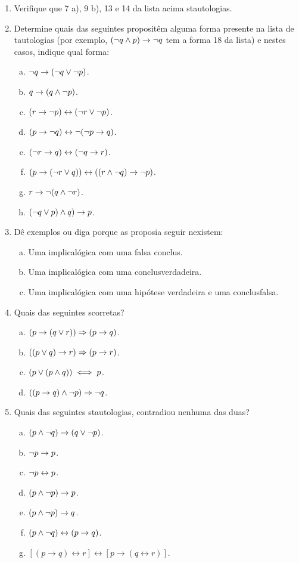 \begin{enumerate}[{\bf 1.}]
\item Verifique que 7 a), 9 b), 13 e 14 da lista acima s\ao tautologias.

\item Determine quais das seguintes proposi\coes t\^em alguma forma presente na lista de tautologias (por exemplo, $(\lnot q\wedge p)\to\lnot q$ tem a forma 18 da lista) e nestes casos, indique qual forma:
\begin{enumerate}[a)]
\item $\lnot q\to(\lnot q \vee\lnot p)$.
\item $q\to (q\wedge\lnot p)$.
\item $(r\to\lnot p)\leftrightarrow(\lnot r\vee\lnot p)$.
\item $(p\to\lnot q)\leftrightarrow\lnot(\lnot p\to q)$.
\item $(\lnot r\to q)\leftrightarrow(\lnot q\to r)$.
\item $(p\to(\lnot r\vee q))\leftrightarrow((r\wedge\lnot q)\to\lnot p)$.
\item $r\to\lnot(q\wedge\lnot r)$.
\item $(\lnot q\vee p)\wedge q)\to p$.
\end{enumerate}

\item D\^e exemplos ou diga porque as proposi\coes a seguir n\ao existem:
\begin{enumerate}[a)]
\item Uma implica\cao l\'ogica com uma falsa conclus\aoi. 
\item Uma implica\cao l\'ogica com uma conclus\ao verdadeira.
\item Uma implica\cao l\'ogica com uma hip\'otese verdadeira e uma conclus\ao falsa.
\end{enumerate}

\item Quais das seguintes s\ao corretas?
\begin{enumerate}[a)]
\item $(p\to(q\vee r))\Rightarrow(p\to q)$.
\item $((p\vee q)\to r)\Rightarrow(p\to r)$.
\item $(p\vee(p\wedge q))\iff p$.
\item $((p\to q)\wedge\lnot p)\Rightarrow\lnot q$.
\end{enumerate}

\item Quais das seguintes s\ao tautologias, contradi\coes ou nenhuma das duas?
\begin{enumerate}[a)]
\item $(p\wedge\lnot q)\to(q \vee \lnot p)$.
\item $\lnot p \to p$.
\item $\lnot p \leftrightarrow p$.
\item $(p\wedge\lnot p)\to p$.
\item $(p\wedge\lnot p)\to q$.
\item $(p\wedge\lnot q)\leftrightarrow(p\to q)$.
\item $[(p\to q) \leftrightarrow r]\leftrightarrow[p\to(q\leftrightarrow r)]$.
\end{enumerate}


\end{enumerate}
